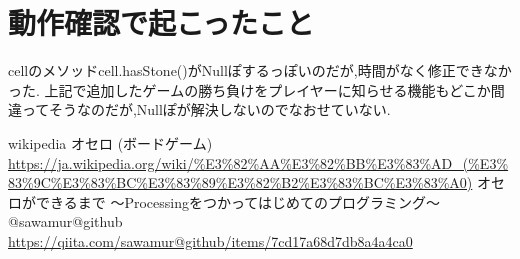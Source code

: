 \documentclass[12pt,a4j]{jarticle}
\begin{document}
\section{動作確認で起こったこと}
cellのメソッドcell.hasStone()がNullぽするっぽいのだが,時間がなく修正できなかった.
上記で追加したゲームの勝ち負けをプレイヤーに知らせる機能もどこか間違ってそうなのだが,Nullぽが解決しないのでなおせていない.

\begin{thebibliography}{2}
   wikipedia オセロ (ボードゲーム) \url{https://ja.wikipedia.org/wiki/%E3%82%AA%E3%82%BB%E3%83%AD_(%E3%83%9C%E3%83%BC%E3%83%89%E3%82%B2%E3%83%BC%E3%83%A0)}
   オセロができるまで 〜Processingをつかってはじめてのプログラミング〜 @sawamur@github \url{https://qiita.com/sawamur@github/items/7cd17a68d7db8a4a4ca0}
\end{thebibliography}
\end{document}
